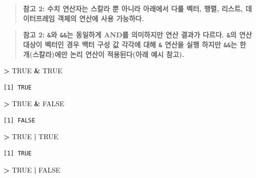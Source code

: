 \documentclass[11pt,a4paper]{book}
\newenvironment{Shaded}{\begin{snugshade}}{\end{snugshade}}
\newcommand{\StringTok}[1]{\textcolor[rgb]{0.31,0.60,0.02}{#1}}
\newcommand{\OtherTok}[1]{\textcolor[rgb]{0.56,0.35,0.01}{#1}}
\newcommand{\OperatorTok}[1]{\textcolor[rgb]{0.81,0.36,0.00}{\textbf{#1}}}
\theoremstyle{definition}
\theoremstyle{definition}
\theoremstyle{definition}
\theoremstyle{remark}
\begin{document}
\begin{quote}
\textbf{참고 2: 수치 연산자는 스칼라 뿐 아니라 아래에서 다룰 벡터, 행렬,
리스트, 데이터프레임 객체의 연산에 사용 가능하다.}
\end{quote}

\begin{quote}
\textbf{참고 2: \texttt{\&}와 \texttt{\&\&}는 동일하게 AND를 의미하지만
연산 결과가 다르다. \texttt{\&}의 연산 대상이 벡터인 경우 백터 구성 값
각각에 대해 \texttt{\&} 연산을 실행 하지만 \texttt{\&\&}는 한
개(스칼라)에만 논리 연산이 적용된다(아래 예시 참고).}
\end{quote}

\footnotesize

\begin{Shaded}
\begin{Highlighting}[]
\OperatorTok{>}\StringTok{ }\OtherTok{TRUE} \OperatorTok{&}\StringTok{ }\OtherTok{TRUE}
\end{Highlighting}
\end{Shaded}

\begin{verbatim}
[1] TRUE
\end{verbatim}

\begin{Shaded}
\begin{Highlighting}[]
\OperatorTok{>}\StringTok{ }\OtherTok{TRUE} \OperatorTok{&}\StringTok{ }\OtherTok{FALSE}
\end{Highlighting}
\end{Shaded}

\begin{verbatim}
[1] FALSE
\end{verbatim}

\begin{Shaded}
\begin{Highlighting}[]
\OperatorTok{>}\StringTok{ }\OtherTok{TRUE} \OperatorTok{|}\StringTok{ }\OtherTok{TRUE}
\end{Highlighting}
\end{Shaded}

\begin{verbatim}
[1] TRUE
\end{verbatim}

\begin{Shaded}
\begin{Highlighting}[]
\OperatorTok{>}\StringTok{ }\OtherTok{TRUE} \OperatorTok{|}\StringTok{ }\OtherTok{FALSE}
\end{Highlighting}
\end{Shaded}
\end{document}
